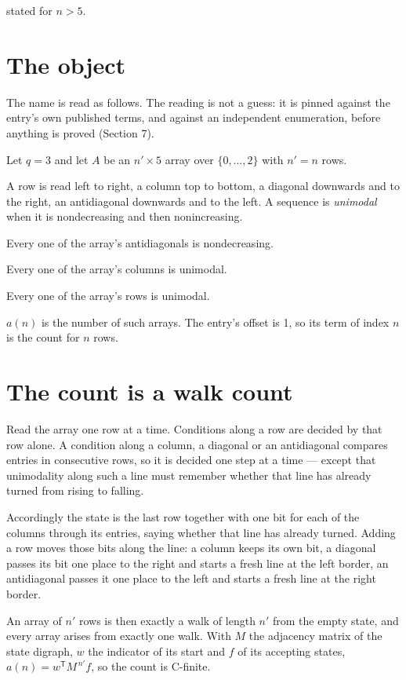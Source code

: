 \documentclass[11pt]{article}
\theoremstyle{definition}
\begin{document}
stated for $n > 5$.

\section{The object}

The name is read as follows. The reading is not a guess: it is pinned against the entry's own published terms, and against an independent enumeration, before anything is proved (Section 7).

Let $q = 3$ and let $A$ be an $n' \times 5$ array over $\{0,\dots,2\}$ with $n' = n$ rows.

A row is read left to right, a column top to bottom, a diagonal downwards and to the right, an antidiagonal downwards and to the left. A sequence is {\itshape unimodal} when it is nondecreasing and then nonincreasing.

Every one of the array's antidiagonals is nondecreasing.

Every one of the array's columns is unimodal.

Every one of the array's rows is unimodal.

$a(n)$ is the number of such arrays. The entry's offset is 1, so its term of index $n$ is the count for $n$ rows.

\section{The count is a walk count}

Read the array one row at a time. Conditions along a row are decided by that row alone. A condition along a column, a diagonal or an antidiagonal compares entries in consecutive rows, so it is decided one step at a time --- except that unimodality along such a line must remember whether that line has already turned from rising to falling.

Accordingly the state is the last row together with one bit for each of the columns through its entries, saying whether that line has already turned. Adding a row moves those bits along the line: a column keeps its own bit, a diagonal passes its bit one place to the right and starts a fresh line at the left border, an antidiagonal passes it one place to the left and starts a fresh line at the right border.

An array of $n'$ rows is then exactly a walk of length $n'$ from the empty state, and every array arises from exactly one walk. With $M$ the adjacency matrix of the state digraph, $w$ the indicator of its start and $f$ of its accepting states, $a(n) = w^{\mathsf T}M^{\,n'}f$, so the count is C-finite.
\end{document}
